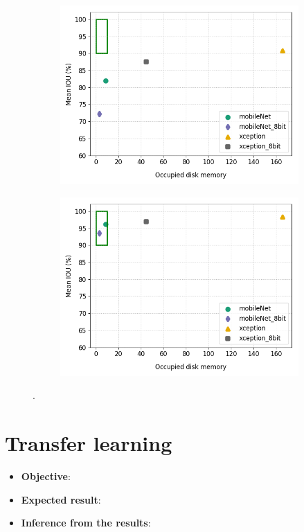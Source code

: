\begin{figure}
\begin{subfigure}{.5\textwidth}
			\includegraphics[width=1\linewidth]{images/q_mem_v_shape}
		\end{subfigure}
		\begin{subfigure}{.5\textwidth}
			\centering
			\includegraphics[width=1\linewidth]{images/q_mem_v_bin}
		\end{subfigure}
		\caption{.}
		\label{Fig:quant}
	\end{figure}

\section{Transfer learning}

	\begin{itemize}
		\item \textbf{Objective}:
		\item \textbf{Expected result}:
		\item \textbf{Inference from the results}:
	\end{itemize}

